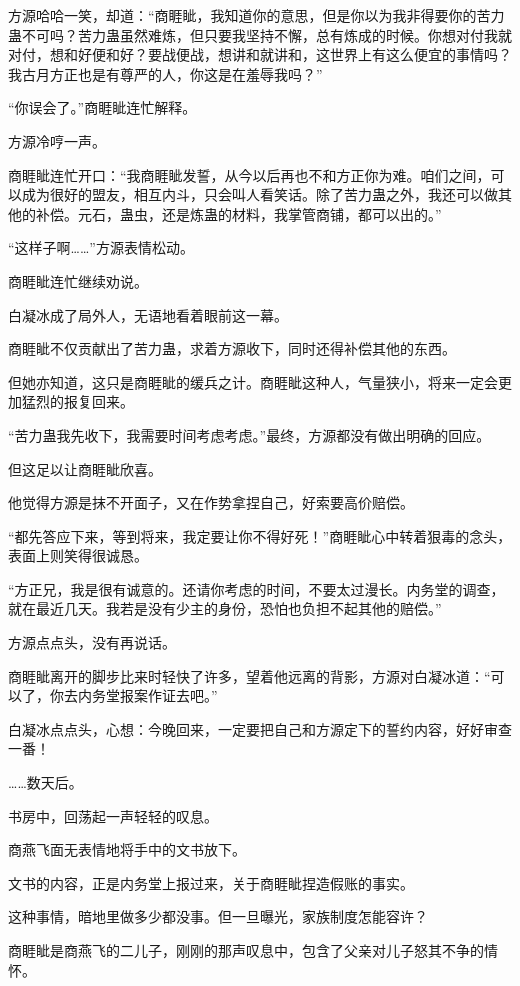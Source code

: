 \begin{this_body}
方源哈哈一笑，却道：“商睚眦，我知道你的意思，但是你以为我非得要你的苦力蛊不可吗？苦力蛊虽然难炼，但只要我坚持不懈，总有炼成的时候。你想对付我就对付，想和好便和好？要战便战，想讲和就讲和，这世界上有这么便宜的事情吗？我古月方正也是有尊严的人，你这是在羞辱我吗？”

“你误会了。”商睚眦连忙解释。

方源冷哼一声。

商睚眦连忙开口：“我商睚眦发誓，从今以后再也不和方正你为难。咱们之间，可以成为很好的盟友，相互内斗，只会叫人看笑话。除了苦力蛊之外，我还可以做其他的补偿。元石，蛊虫，还是炼蛊的材料，我掌管商铺，都可以出的。”

“这样子啊……”方源表情松动。

商睚眦连忙继续劝说。

白凝冰成了局外人，无语地看着眼前这一幕。

商睚眦不仅贡献出了苦力蛊，求着方源收下，同时还得补偿其他的东西。

但她亦知道，这只是商睚眦的缓兵之计。商睚眦这种人，气量狭小，将来一定会更加猛烈的报复回来。

“苦力蛊我先收下，我需要时间考虑考虑。”最终，方源都没有做出明确的回应。

但这足以让商睚眦欣喜。

他觉得方源是抹不开面子，又在作势拿捏自己，好索要高价赔偿。

“都先答应下来，等到将来，我定要让你不得好死！”商睚眦心中转着狠毒的念头，表面上则笑得很诚恳。

“方正兄，我是很有诚意的。还请你考虑的时间，不要太过漫长。内务堂的调查，就在最近几天。我若是没有少主的身份，恐怕也负担不起其他的赔偿。”

方源点点头，没有再说话。

商睚眦离开的脚步比来时轻快了许多，望着他远离的背影，方源对白凝冰道：“可以了，你去内务堂报案作证去吧。”

白凝冰点点头，心想：今晚回来，一定要把自己和方源定下的誓约内容，好好审查一番！

……数天后。

书房中，回荡起一声轻轻的叹息。

商燕飞面无表情地将手中的文书放下。

文书的内容，正是内务堂上报过来，关于商睚眦捏造假账的事实。

这种事情，暗地里做多少都没事。但一旦曝光，家族制度怎能容许？

商睚眦是商燕飞的二儿子，刚刚的那声叹息中，包含了父亲对儿子怒其不争的情怀。


\end{this_body}
